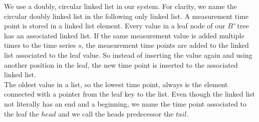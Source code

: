 \documentclass[abstracton,12pt,oneside]{scrreprt}
\begin{document}
We use a doubly, circular linked list in our system. For clarity, we name the circular doubly linked list in the following only linked list. A measurement time point is stored in a linked list element. Every value in a leaf node of our $B^+$tree has an associated linked list. If the same measurement value is added multiple times to the time series $s$, the measurement time points are added to the linked list associated to the leaf value. So instead of inserting the value again and using another position in the leaf, the new time point is inserted to the associated linked list.\\ 
The oldest value in a list, so the lowest time point, always is the element connected with a pointer from the leaf key to the list. Even though the linked list not literally has an end and a beginning, we name the time point associated to the leaf the $head$ and we call the heads predecessor the $tail$. 
\end{document}
